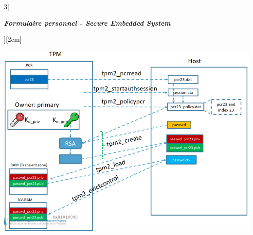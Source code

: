 \begin{multicols}{3}[\centerline{ \large\em \textbf{Formulaire personnel - Secure Embedded System}}][2cm]
\begin{minipage}{\linewidth}
	\centering
    \includegraphics[width =0.6\columnwidth]{images/51.png}
\end{minipage}

\end{multicols}